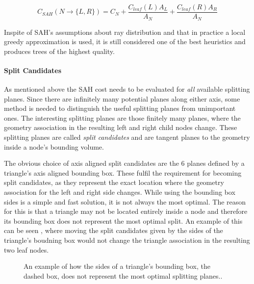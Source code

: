 \begin{displaymath}
  C_{SAH}(N \rightarrow \{L, R\}) = C_N + \frac{C_{leaf}(L) A_L}{A_N}
  + \frac{C_{leaf}(R) A_R}{A_N}
\end{displaymath}


Inspite of SAH's assumptions about ray distribution and that in
practice a local greedy approximation is used, it is still considered
one of the best heuristics and produces trees of the highest quality.



\paragraph{Split Candidates}


As mentioned above the SAH cost needs to be evaluated for \textit{all}
available splitting planes. Since there are infinitely many potential
planes along either axis, some method is needed to distinguish the
useful splitting planes from unimportant ones. The interesting
splitting planes are those finitely many planes, where the geometry
association in the resulting left and right child nodes change. These
splitting planes are called \textit{split candidates} and are tangent
planes to the geometry inside a node's bounding volume.


The obvious choice of axis aligned split candidates are the 6 planes
defined by a triangle's axis aligned bounding box. These fulfil the
requirement for becoming split candidates, as they represent the exact
location where the geometry association for the left and right side
changes. While using the bounding box sides is a simple and fast
solution, it is not always the most optimal. The reason for this is
that a triangle may not be located entirely inside a node and
therefore its bounding box does not represent the most optimal
split. An example of this can be seen , where
moving the split candidates given by the sides of the triangle's
boudning box would not change the triangle association in the
resulting two leaf nodes.

\begin{figure}
  \centering

  \vspace{3mm}
  \parbox{5cm}{\caption[Triangle/Node bounding box intersection.]{An
      example of how the sides of a triangle's bounding box, the
      dashed box, does not represent the most optimal splitting
      planes..}\label{fig:aabbSplit}}
\end{figure}

